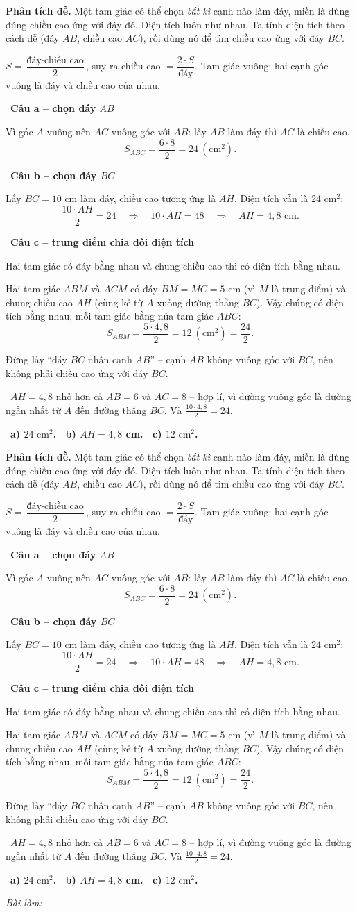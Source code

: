 \documentclass[11pt]{article}
\newif\ifsol \soltrue
\providecommand{\AnsWord}{Đáp số}
\newcommand{\StuProb}[2]{\begin{probboxS}{#1}{#2}\StuProbBody\end{probboxS}}
\newcommand{\ans}[1]{\par\smallskip{\bfseries\color{tmGreen!88!black}\AnsWord:}\ {\bfseries\color{AnsRed}#1}\par}
\newcommand{\probsol}[1]{%
  \begin{lrbox}{\solmeasure}\begin{minipage}{\dimexpr\linewidth-24pt\relax}#1\end{minipage}\end{lrbox}%
  \ifsol
    \begin{solbox}#1\end{solbox}%
  \else
    \setlength{\solht}{\dimexpr\ht\solmeasure+\dp\solmeasure+0.85cm\relax}%
    \ifdim\solht<1.35cm\setlength{\solht}{1.35cm}\fi
    \ifdim\solht>\StudentMaxWork\setlength{\solht}{\StudentMaxWork}\fi
    \par\noindent\begin{minipage}{\linewidth}%
    \expandafter\StuProb\StuProbArgs
    \begin{tcolorbox}[colback=white,colframe=Line,boxrule=0.8pt,arc=5pt,
      left=8pt,right=8pt,top=4pt,bottom=4pt,height=\solht]{\footnotesize\color{Slate}\itshape\WorkWord}\end{tcolorbox}%
    \end{minipage}\par\medskip
  \fi}
\newlength{\StudentMaxWork}\setlength{\StudentMaxWork}{4.5cm}
\newcommand{\step}[2]{\par\smallskip\noindent{\bfseries\color{tmBlue!85!black}\StepWord~#1.}\ {\bfseries #2}\par\nopagebreak}
\newcommand{\verify}[1]{\par\smallskip\noindent{\bfseries\color{tmGreen!80!black}\faCheckCircle\ \CheckWord}\ #1\par}
\def\WorkWord{Bài làm:}
\def\AnsWord{Đáp số}
\def\StepWord{Bước}
\def\CheckWord{Thử lại:}
\begin{document}
\probsol{
\textbf{Phân tích đề.} Một tam giác có thể chọn \emph{bất kì} cạnh nào làm đáy, miễn là dùng đúng chiều cao ứng với đáy đó. Diện tích luôn như nhau. Ta tính diện tích theo cách dễ (đáy $AB$, chiều cao $AC$), rồi dùng nó để tìm chiều cao ứng với đáy $BC$.
\begin{recallbox}$S=\dfrac{\text{đáy}\cdot\text{chiều cao}}{2}$, suy ra chiều cao $=\dfrac{2\cdot S}{\text{đáy}}$. Tam giác vuông: hai cạnh góc vuông là đáy và chiều cao của nhau.\end{recallbox}
\step{1}{Câu a -- chọn đáy $AB$}
Vì góc $A$ vuông nên $AC$ vuông góc với $AB$: lấy $AB$ làm đáy thì $AC$ là chiều cao.
\[ S_{ABC}=\frac{6\cdot8}{2}=24\ (\text{cm}^2). \]

\step{2}{Câu b -- chọn đáy $BC$}
Lấy $BC=10$ cm làm đáy, chiều cao tương ứng là $AH$. Diện tích vẫn là $24\text{ cm}^2$:
\[ \frac{10\cdot AH}{2}=24\quad\Rightarrow\quad 10\cdot AH=48\quad\Rightarrow\quad AH=4{,}8\text{ cm}. \]

\step{3}{Câu c -- trung điểm chia đôi diện tích}
\begin{recallbox}Hai tam giác có đáy bằng nhau và chung chiều cao thì có diện tích bằng nhau.\end{recallbox}
Hai tam giác $ABM$ và $ACM$ có đáy $BM=MC=5$ cm (vì $M$ là trung điểm) và chung chiều cao $AH$ (cùng kẻ từ $A$ xuống đường thẳng $BC$). Vậy chúng có diện tích bằng nhau, mỗi tam giác bằng nửa tam giác $ABC$:
\[ S_{ABM}=\frac{5\cdot4{,}8}{2}=12\ (\text{cm}^2)=\frac{24}{2}. \]
\begin{warnbox}Đừng lấy ``đáy $BC$ nhân cạnh $AB$'' -- cạnh $AB$ không vuông góc với $BC$, nên không phải chiều cao ứng với đáy $BC$.\end{warnbox}
\verify{$AH=4{,}8$ nhỏ hơn cả $AB=6$ và $AC=8$ -- hợp lí, vì đường vuông góc là đường ngắn nhất từ $A$ đến đường thẳng $BC$. Và $\frac{10\cdot4{,}8}{2}=24$.}
\ans{a) $24\text{ cm}^2$. \ b) $AH=4{,}8$ cm. \ c) $12\text{ cm}^2$.}
}

\providecommand{\tbGrid}[4]{\begin{tikzpicture}[baseline=0.2cm,x=0.5cm,y=0.5cm]
  \draw[Ink,line width=0.7pt] (0,0) grid[step=1] (2,2);
  \node[font=\sffamily\bfseries,text=tmBlue!80!black,inner sep=0pt,#4] at (#1,#2) {#3};\end{tikzpicture}}
\providecommand{\rvbbG}[6]{\draw[Ink,line width=0.7pt] (#1,#2) rectangle ++(1,1)
  ({#1+0.5},#2)--++(0,1) (#1,{#2+0.5})--++(1,0);
  \node[font=\sffamily\bfseries,text=tmBlue!80!black,inner sep=0pt,#6] at ({#1+#3},{#2+#4}) {#5};}
\end{document}
